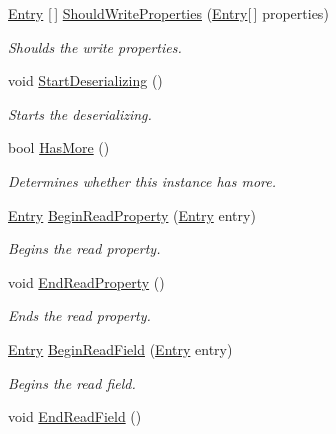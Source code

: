 \begin{DoxyCompactItemize}
\hyperlink{class_serialization_1_1_entry}{Entry} \mbox{[}$\,$\mbox{]} \hyperlink{interface_serialization_1_1_i_storage_a0d4c95743d604600b55492194d54717b}{Should\+Write\+Properties} (\hyperlink{class_serialization_1_1_entry}{Entry}\mbox{[}$\,$\mbox{]} properties)
\begin{DoxyCompactList}\small\item\em Shoulds the write properties. \end{DoxyCompactList}\item 
void \hyperlink{interface_serialization_1_1_i_storage_ab0432907fec979aa0832b659b4bd8d67}{Start\+Deserializing} ()
\begin{DoxyCompactList}\small\item\em Starts the deserializing. \end{DoxyCompactList}\item 
bool \hyperlink{interface_serialization_1_1_i_storage_a167bf2c224e928c05446f0fde56e9d8d}{Has\+More} ()
\begin{DoxyCompactList}\small\item\em Determines whether this instance has more. \end{DoxyCompactList}\item 
\hyperlink{class_serialization_1_1_entry}{Entry} \hyperlink{interface_serialization_1_1_i_storage_a4dab514d85acc8b9c97934025438cccf}{Begin\+Read\+Property} (\hyperlink{class_serialization_1_1_entry}{Entry} entry)
\begin{DoxyCompactList}\small\item\em Begins the read property. \end{DoxyCompactList}\item 
void \hyperlink{interface_serialization_1_1_i_storage_a5193e529b49bfccf51f893ebcabc8e80}{End\+Read\+Property} ()
\begin{DoxyCompactList}\small\item\em Ends the read property. \end{DoxyCompactList}\item 
\hyperlink{class_serialization_1_1_entry}{Entry} \hyperlink{interface_serialization_1_1_i_storage_a369241f5ffd8446da4a57c72a8646f09}{Begin\+Read\+Field} (\hyperlink{class_serialization_1_1_entry}{Entry} entry)
\begin{DoxyCompactList}\small\item\em Begins the read field. \end{DoxyCompactList}\item 
void \hyperlink{interface_serialization_1_1_i_storage_ad27a910b48b01fcee850465606cd2a6f}{End\+Read\+Field} ()

\end{DoxyCompactItemize}

